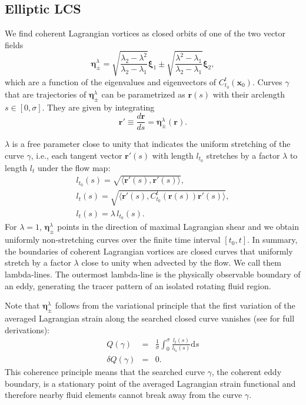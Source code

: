 \documentclass{article}
\begin{document}
\subsection{Elliptic LCS}
We find coherent Lagrangian vortices as closed orbits of one of the two vector fields
\begin{equation}
\boldsymbol \eta^{\lambda}_\pm = \sqrt{\frac{\lambda_2 - \lambda^2}{\lambda_2 - \lambda_1}} \boldsymbol \xi_1 \pm \sqrt{\frac{\lambda^2 - \lambda_1}{\lambda_2 
- \lambda_1}} \boldsymbol \xi_2,
\label{eq:eta}
\end{equation}
which are a function of the eigenvalues and eigenvectors of $C_{t_0}^t(\boldsymbol x_0)$.
Curves $\gamma$ that are trajectories of $\boldsymbol \eta^{\lambda}_\pm$ can be parametrized as $\boldsymbol r(s)$ with their arclength $s \in [0,\sigma]$. They are given by integrating
\begin{equation}
\boldsymbol r' \equiv \frac{d \boldsymbol r}{ds} = \boldsymbol \eta^{\lambda}_\pm(\boldsymbol r).
\label{eq:etafields}
\end{equation}

$\lambda$ is a free parameter close to unity that indicates the uniform stretching of the curve $\gamma$, i.e., each tangent vector $\boldsymbol r'(s)$ with length $l_{t_0}$ stretches by a factor $\lambda$ to length $l_{t}$ under the flow map:
\begin{gather*}
l_{t_0}(s) = \sqrt{\langle \boldsymbol r'(s), \boldsymbol r'(s) \rangle},\\
l_t(s) = \sqrt{\langle \boldsymbol r'(s), C_{t_0}^t(\boldsymbol r(s)) \boldsymbol r'(s) \rangle},\\
l_t(s) = \lambda\, l_{t_0}(s).
\end{gather*}
For $\lambda=1$, $\boldsymbol \eta^{\lambda}_\pm$ points in the direction of maximal Lagrangian shear and we obtain uniformly non-stretching curves over the finite time interval $[t_0, t]$. 
In summary, the boundaries of coherent Lagrangian vortices are closed curves that uniformly stretch by a factor $\lambda$ close to unity when advected by the flow. We call them lambda-lines. The outermost lambda-line is the physically observable boundary of an eddy, generating the tracer pattern of an isolated rotating fluid region.

Note that $\boldsymbol \eta^{\lambda}_\pm$ follows from the variational principle that the first variation of the averaged Lagrangian strain along the searched closed curve vanishes (see \parencite{haller13:_coher_lagran} for full derivations):
\begin{eqnarray}
Q(\gamma) &=& \frac{1}{\sigma} \int_0^\sigma \frac{l_t(s)}{l_{t_0}(s)}\text{d}s \\
\delta Q(\gamma) &=& 0.
\end{eqnarray}
This coherence principle means that the searched curve $\gamma$, the coherent eddy boundary, is a stationary point of the averaged Lagrangian strain functional and therefore nearby fluid elements cannot break away from the curve $\gamma$.
 
\end{document}
